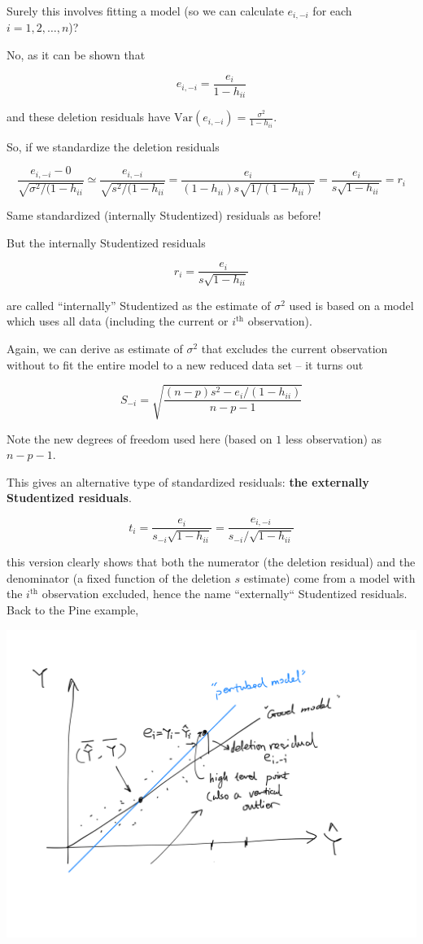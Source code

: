 \documentclass[a4paper, 11pt, twoside]{article}
\begin{document}
Surely this involves fitting a model (so we can calculate $e_{i,-i}$ for each $i=1,2,\dots, n$)?

No, as it can be shown that

\[e_{i,-i}=\frac{e_i}{1-h_{ii}}\]

and these deletion residuals have $\text{Var}(e_{i,-i})=\frac{\sigma^2}{1-h_{ii}}$.

So, if we standardize the deletion residuals

\[\frac{e_{i,-i}-0}{\sqrt{\sigma^2/(1-h_{ii}}}\simeq\frac{e_{i,-i}}{\sqrt{s^2/(1-h_{ii}}}=\frac{e_i}{(1-h_{ii})s\sqrt{1/(1-h_{ii})}}=\frac{e_i}{s\sqrt{1-h_{ii}}}=r_i\]

Same standardized (internally Studentized) residuals as before!

But the internally Studentized residuals

\[r_i=\frac{e_i}{s\sqrt{1-h_{ii}}}\]

are called ``internally''  Studentized as the estimate of $\sigma^2$ used is based on a model which uses all data (including the current or $i^{\text{th}}$ observation).

Again, we can derive as estimate of $\sigma^2$ that excludes the current observation without to fit the entire model to a new reduced data set -- it turns out

\[S_{-i}=\sqrt{\frac{(n-p)s^2-e_i/(1-h_{ii})}{n-p-1}}\]

Note the new degrees of freedom used here (based on $1$ less observation) as $n-p-1$.

This gives an alternative type of standardized residuals: \textbf{the externally Studentized residuals}.

\[t_i=\frac{e_i}{s_{-i}\sqrt{1-h_{ii}}}=\frac{e_{i,-i}}{s_{-i}/\sqrt{1-h_{ii}}}\]

this version clearly shows that both the numerator (the deletion residual) and the denominator (a fixed function of the deletion $s$ estimate) come from a model with the $i^{\text{th}}$ observation excluded, hence the name ``externally`` Studentized residuals.\\

Back to the Pine example,

\includegraphics[width=\textwidth]{pine}
\end{document}
